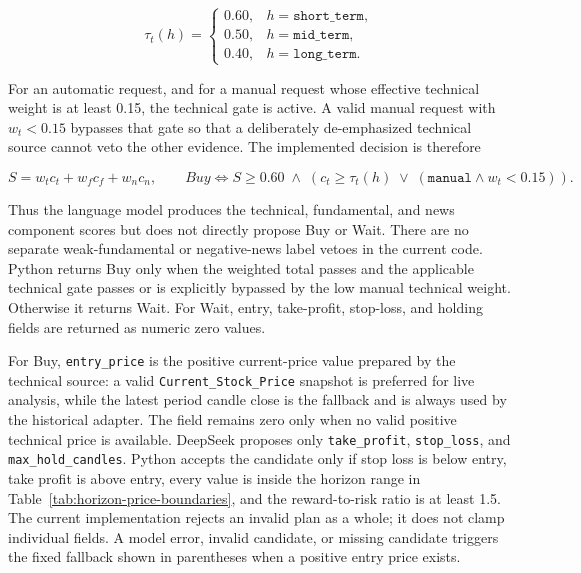\begin{equation}
    \tau_t(h)=
    \begin{cases}
        0.60, & h=\texttt{short\_term},\\
        0.50, & h=\texttt{mid\_term},\\
        0.40, & h=\texttt{long\_term}.
    \end{cases}
\end{equation}

For an automatic request, and for a manual request whose effective technical weight is at least 0.15, the technical gate is active. A valid manual request with $w_t<0.15$ bypasses that gate so that a deliberately de-emphasized technical source cannot veto the other evidence. The implemented decision is therefore

\begin{equation}
    S = w_t c_t + w_f c_f + w_n c_n,
    \qquad
    \textit{Buy} \iff S \geq 0.60
    \;\land\;
    \left(c_t \geq \tau_t(h)\;\lor\;(\texttt{manual}\land w_t<0.15)\right).
    \label{eq:recommendation-score}
\end{equation}

Thus the language model produces the technical, fundamental, and news component scores but does not directly propose Buy or Wait. There are no separate weak-fundamental or negative-news label vetoes in the current code. Python returns Buy only when the weighted total passes and the applicable technical gate passes or is explicitly bypassed by the low manual technical weight. Otherwise it returns Wait. For Wait, entry, take-profit, stop-loss, and holding fields are returned as numeric zero values.

For Buy, \texttt{entry\_price} is the positive current-price value prepared by the technical source: a valid \texttt{Current\_Stock\_Price} snapshot is preferred for live analysis, while the latest period candle close is the fallback and is always used by the historical adapter. The field remains zero only when no valid positive technical price is available. DeepSeek proposes only \texttt{take\_profit}, \texttt{stop\_loss}, and \texttt{max\_hold\_candles}. Python accepts the candidate only if stop loss is below entry, take profit is above entry, every value is inside the horizon range in Table~\ref{tab:horizon-price-boundaries}, and the reward-to-risk ratio is at least 1.5. The current implementation rejects an invalid plan as a whole; it does not clamp individual fields. A model error, invalid candidate, or missing candidate triggers the fixed fallback shown in parentheses when a positive entry price exists.

